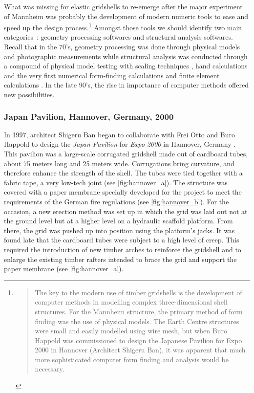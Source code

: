 What was missing for elastic gridshells to re-emerge after the major experiment of Mannheim was probably the development of modern numeric tools to ease and speed up the design process.\footnote{\blockcquote[]{Harris2003}{The key to the modern use of timber gridshells is the development of computer methods in modelling complex three-dimensional shell structures. For the Mannheim structure, the primary method of form finding was the use of physical models. The Earth Centre structures were small and easily modelled using wire mesh, but when Buro Happold was commissioned to design the Japanese Pavilion for Expo 2000 in Hannover (Architect Shigeru Ban), it was apparent that much more sophisticated computer form finding and analysis would be necessary.}} Amongst those tools we should identify two main categories~: geometry processing softwares and structural analysis softwares. Recall that in the 70's, geometry processing was done through physical models and photographic measurements \cite[pp.~130-135]{IL10} while structural analysis was conducted through a compound of physical model testing with scaling techniques \cite[pp.~130-135]{IL13}, hand calculations and the very first numerical form-finding calculations \cite[pp.~184-193]{IL10} and finite element calculations \cite[pp.~210-217]{IL10}. In the late 90's, the rise in importance of computer methods offered new possibilities.

\subsubsection{Japan Pavilion, Hannover, Germany, 2000}
In 1997, architect Shigeru Ban began to collaborate with Frei Otto and Buro Happold to design the \emph{Japan Pavilion} for \emph{Expo 2000} in Hannover, Germany \cite{Ban2006}. This pavilion was a large-scale corrugated gridshell made out of cardboard tubes, about 75 meters long and 25 meters wide. Corrugations bring curvature, and therefore enhance the strength of the shell. The tubes were tied together with a fabric tape, a very low-tech joint (see \cref{fig:hannover_a}). The structure was covered with a paper membrane specially developed for the project to meet the requirements of the German fire regulations (see \cref{fig:hannover_b}). For the occasion, a new erection method was set up in which the grid was laid out not at the ground level but at a higher level on a hydraulic scaffold platform. From there, the grid was pushed up into position using the platform's jacks. It was found late that the cardboard tubes were subject to a high level of creep. This required the introduction of new timber arches to reinforce the gridshell and to enlarge the existing timber rafters intended to brace the grid and support the paper membrane (see \cref{fig:hannover_a}).

